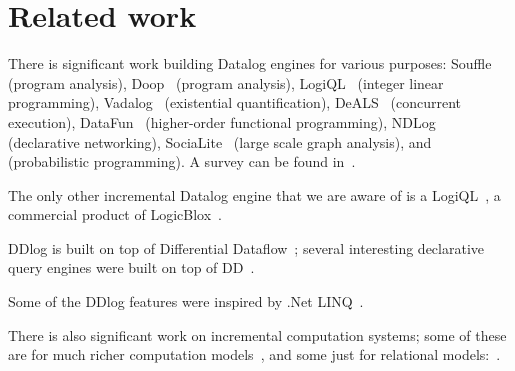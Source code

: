 \section{Related work}

There is significant work building Datalog engines for various
purposes: Souffle~\cite{scholz-cc16} (program analysis),
Doop~\cite{Bravenboer-oopsla09} (program analysis),
LogiQL~\cite{Borraz-Sanchez-dlp18} (integer linear programming),
Vadalog~\cite{Bellomarini-vldb18} (existential quantification),
DeALS~\cite{Yang-vldb17} (concurrent execution),
DataFun~\cite{Arntzenius-icfp16} (higher-order functional
programming), NDLog~\cite{loo-cacm09} (declarative networking),
SociaLite~\cite{Seo-vldb13} (large scale graph analysis),
and~\cite{Barany-tods17} (probabilistic programming).  A survey can be
found in~\cite{Maier-book18}.

The only other incremental Datalog engine that we are aware of is a
LogiQL~\cite{Green-pods15}, a commercial product of
LogicBlox~\cite{Aref-sigmod15}.

DDlog is built on top of Differential Dataflow~\cite{dd}; several
interesting declarative query engines were built on top of
DD~\cite{timely-dataflow,differential-dataflow-paper}.

Some of the DDlog features were inspired by .Net
LINQ~\cite{meijer-dpcool03,Meijer-sigmod06}.

There is also significant work on incremental computation systems;
some of these are for much richer computation
models~\cite{acar-05,Carlsson-icfp02,Demetrescu-oopsla11,harkes-ecoop16,Hammer-pldi14},
and some just for relational
models:~\cite{ahmad-vldb12,Szabo-ase016,zhao-icmd17}.
